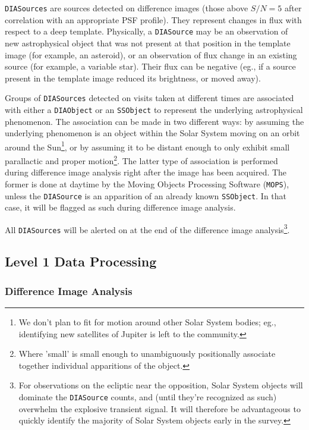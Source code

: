 \documentclass[12pt]{article}
\newcommand{\code}[1]{\texttt{#1}}
\newcommand{\DIASource}{\code{DIASource}\xspace}
\newcommand{\DIASources}{\code{DIASources}\xspace}
\newcommand{\DIAObject}{\code{DIAObject}\xspace}
\newcommand{\SSObject}{\code{SSObject}\xspace}
\begin{document}
\DIASources are sources detected on difference images (those above $S/N=5$
after correlation with an appropriate PSF profile). They represent changes in
flux with respect to a deep template. Physically, a \DIASource may be an
observation of new astrophysical object that was not present at that position
in the template image (for example, an asteroid), or an observation of flux
change in an existing source (for example, a variable star). Their flux can be
negative (eg., if a source present in the template image reduced its
brightness, or moved away).

Groups of \DIASources detected on visits taken at different times are
associated with either a \DIAObject or an \SSObject to represent the
underlying astrophysical phenomenon. The association can be made in two
different ways: by assuming the underlying phenomenon is an object within the
Solar System moving on an orbit around the Sun\footnote{We don't plan to fit
for motion around other Solar System bodies; eg., identifying new satellites
of Jupiter is left to the community.}, or by assuming it to be distant enough
to only exhibit small parallactic and proper motion\footnote{Where 'small' is
small enough to unambiguously positionally associate together individual
apparitions of the object.}. The latter type of association is performed
during difference image analysis right after the image has been acquired. The
former is done at daytime by the Moving Objects Processing Software
(\code{MOPS}), unless the \DIASource is an apparition of an already known
\SSObject. In that case, it will be flagged as such during difference image
analysis.

All \DIASources will be alerted on at the end of the difference image
analysis\footnote{For observations on the ecliptic near the opposition, Solar
System objects will dominate the \DIASource counts, and (until they're
recognized as such) overwhelm the explosive transient signal. It will
therefore be advantageous to quickly identify the majority of Solar System
objects early in the survey.}.

\subsection{Level 1 Data Processing}

\subsubsection{Difference Image Analysis}
\label{sec:dia}
\end{document}
